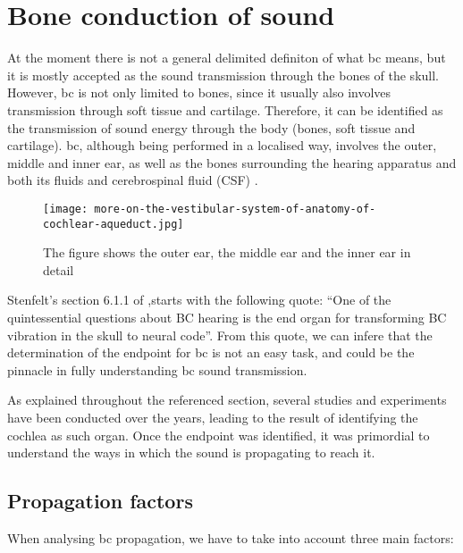 \section{Bone conduction of sound}\label{sec:bonepaths}
At the moment there is not a general delimited definiton of what \gls{bc} means, but it is mostly accepted as the sound transmission through the bones of the skull. However, \gls{bc} is not only limited to bones, since it usually also involves transmission through soft tissue and cartilage. Therefore, it can be identified as the transmission of sound energy through the body (bones, soft tissue and cartilage). 
\gls{bc}, although being performed in a localised way, involves the outer, middle and inner ear, as well as the bones surrounding the hearing apparatus and both its fluids and cerebrospinal fluid (CSF) \citep{puria_2013}.
 \begin{figure}[H]
	\centering
		\texttt{[image: more-on-the-vestibular-system-of-anatomy-of-cochlear-aqueduct.jpg]}
		\caption{The figure shows the outer ear, the middle ear and the inner ear in detail}
		\label{fig:hearing_system_detail}
\end{figure}
Stenfelt's section 6.1.1 of \citep{puria_2013},starts with the following quote: \enquote{One of the quintessential questions about BC hearing is the end organ for
transforming BC vibration in the skull to neural code}. From this quote, we can infere that the determination of the endpoint for \gls{bc} is not an easy task, and could be the pinnacle in fully understanding \gls{bc} sound transmission.

As explained throughout the referenced section, several studies and experiments have been conducted over the years, leading to the result of identifying the cochlea as such organ. Once the endpoint was identified, it was primordial to understand the ways in which the sound is propagating to reach it.
\subsection{Propagation factors}

When analysing \gls{bc} propagation, we have to take into account three main factors:

